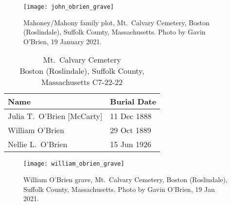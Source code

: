\begin{figure}
	\centering
	\texttt{[image: john\_obrien\_grave]}
	\caption{Mahoney/Mahony family plot, Mt.\ Calvary Cemetery, Boston (Roslindale), Suffolk County, Massachusetts. Photo by Gavin O'Brien, 19 January 2021.}
\end{figure}

\begin{table}[ht]
	\centering
	\caption{Mt.\ Calvary Cemetery\cite{William3OBrienBurial} \\
		Boston (Roslindale), Suffolk County, Massachusetts
		C7-22-22}
	\begin{tabular}{|l|l|}
		\hline
		\textbf{Name} & \textbf{Burial Date} \\
		\hline
		Julia T.\ O'Brien [McCarty]\index{McCarty!Julia T.}\index{O'Brien!Julia T.\ (McCarty)} & 11 Dec 1888 \\
		\hline
		William O'Brien\index{O'Brien!William\textsuperscript{3}} & 29 Oct 1889 \\
		\hline
		Nellie L.\ O'Brien\index{O'Brien!Ellen/Nellie Louise\textsuperscript{4}} & 15 Jun 1926 \\
		\hline
	\end{tabular}
\end{table}

\begin{figure}
	\centering
	\texttt{[image: william\_obrien\_grave]}
	\caption{William O'Brien grave, Mt.\ Calvary Cemetery, Boston (Roslindale), Suffolk County, Massachusetts. Photo by Gavin O'Brien, 19 Jan 2021.}
\end{figure}
